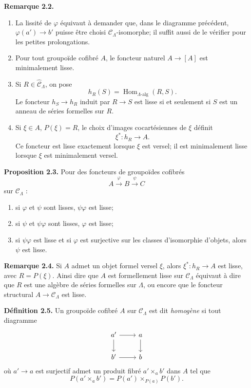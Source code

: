 \documentclass[11pt]{article}
\providecommand{\Hom}{\operatorname{Hom}}
\begin{document}
\textbf{Remarque 2.2.}
\begin{enumerate}[label=(\alph*)]
\item La lissit\'e de \(\varphi\) \'equivaut \`a demander que, dans le diagramme pr\'ec\'edent,
\(\varphi(a')\to b'\) puisse \^etre choisi \(\mathcal C_\Lambda\)-isomorphe; il suffit aussi
de le v\'erifier pour les petites prolongations.

\item Pour tout groupo\"ide cofibr\'e \(A\), le foncteur naturel \(A\to[A]\) est
minimalement lisse.

\item Si \(R\in\widehat{\mathcal C}_\Lambda\), on pose
\[
 h_R(S)=\Hom_{\Lambda\text{-}\mathrm{alg}}(R,S).
\]
Le foncteur \(h_S\to h_R\) induit par \(R\to S\) est lisse si et seulement si \(S\)
est un anneau de s\'eries formelles sur \(R\).

\item Si \(\xi\in A\), \(P(\xi)=R\), le choix d'images cocart\'esiennes de \(\xi\) d\'efinit
\[
 \xi^\ast:h_R\longrightarrow A.
\]
Ce foncteur est lisse exactement lorsque \(\xi\) est versel; il est minimalement lisse
lorsque \(\xi\) est minimalement versel.
\end{enumerate}

\textbf{Proposition 2.3.} Pour des foncteurs de groupo\"ides cofibr\'es
\[
 A\xrightarrow{\varphi}B\xrightarrow{\psi}C
\]
sur \(\mathcal C_\Lambda\) :
\begin{enumerate}[label=(\alph*)]
\item si \(\varphi\) et \(\psi\) sont lisses, \(\psi\varphi\) est lisse;
\item si \(\psi\) et \(\psi\varphi\) sont lisses, \(\varphi\) est lisse;
\item si \(\psi\varphi\) est lisse et si \(\varphi\) est surjective sur les classes
d'isomorphie d'objets, alors \(\psi\) est lisse.
\end{enumerate}

\textbf{Remarque 2.4.} Si \(A\) admet un objet formel versel \(\xi\), alors
\(\xi^\ast:h_R\to A\) est lisse, avec \(R=P(\xi)\). Ainsi dire que \(A\) est
formellement lisse sur \(\mathcal C_\Lambda\) \'equivaut \`a dire que \(R\) est une
alg\`ebre de s\'eries formelles sur \(\Lambda\), ou encore que le foncteur structural
\(A\to\mathcal C_\Lambda\) est lisse.

\textbf{D\'efinition 2.5.} Un groupo\"ide cofibr\'e \(A\) sur \(\mathcal C_\Lambda\) est
dit \emph{homog\`ene} si tout diagramme
\[
\begin{tikzcd}
a' \arrow[r] \arrow[d] & a \arrow[d]\\
b' \arrow[r] & b
\end{tikzcd}
\]
o\`u \(a'\to a\) est surjectif admet un produit fibr\'e \(a'\times_a b'\) dans \(A\) tel que
\[
 P(a'\times_a b')=P(a')\times_{P(a)}P(b').
\]
\end{document}
